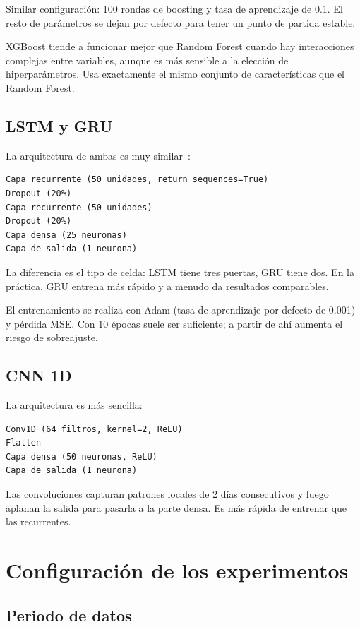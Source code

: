 Similar configuración: 100 rondas de boosting y tasa de aprendizaje de 0.1. El resto de parámetros se dejan por defecto para tener un punto de partida estable.

XGBoost tiende a funcionar mejor que Random Forest cuando hay interacciones complejas entre variables, aunque es más sensible a la elección de hiperparámetros. Usa exactamente el mismo conjunto de características que el Random Forest.

\subsection{LSTM y GRU}

La arquitectura de ambas es muy similar~\cite{hochreiter1997long, cho2014learning}:

\begin{verbatim}
Capa recurrente (50 unidades, return_sequences=True)
Dropout (20%)
Capa recurrente (50 unidades)
Dropout (20%)
Capa densa (25 neuronas)
Capa de salida (1 neurona)
\end{verbatim}

La diferencia es el tipo de celda: LSTM tiene tres puertas, GRU tiene dos. En la práctica, GRU entrena más rápido y a menudo da resultados comparables.

El entrenamiento se realiza con Adam (tasa de aprendizaje por defecto de 0.001) y pérdida MSE. Con 10 épocas suele ser suficiente; a partir de ahí aumenta el riesgo de sobreajuste.

\subsection{CNN 1D}

La arquitectura es más sencilla:

\begin{verbatim}
Conv1D (64 filtros, kernel=2, ReLU)
Flatten
Capa densa (50 neuronas, ReLU)
Capa de salida (1 neurona)
\end{verbatim}

Las convoluciones capturan patrones locales de 2 días consecutivos y luego aplanan la salida para pasarla a la parte densa. Es más rápida de entrenar que las recurrentes.

\section{Configuración de los experimentos}

\subsection{Periodo de datos}

